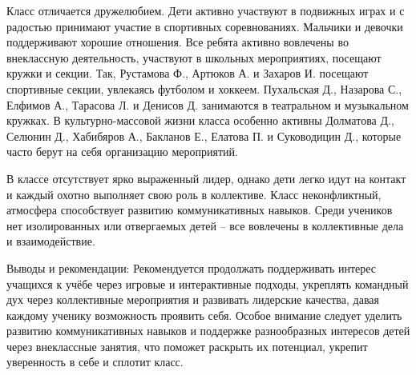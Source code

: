 \documentclass[a4paper,12pt]{article}
\begin{document}
Класс отличается дружелюбием. Дети активно участвуют в подвижных играх и с радостью принимают участие в спортивных соревнованиях. Мальчики и девочки поддерживают хорошие отношения. Все ребята активно вовлечены во внеклассную деятельность, участвуют в школьных мероприятиях, посещают кружки и секции. Так, Рустамова Ф., Артюков А. и Захаров И. посещают спортивные секции, увлекаясь футболом и хоккеем. Пухальская Д., Назарова С., Елфимов А., Тарасова Л. и Денисов Д. занимаются в театральном и музыкальном кружках. В культурно-массовой жизни класса особенно активны Долматова Д., Селюнин Д., Хабибяров А., Бакланов Е., Елатова П. и Суководицин Д., которые часто берут на себя организацию мероприятий.

В классе отсутствует ярко выраженный лидер, однако дети легко идут на контакт и каждый охотно выполняет свою роль в коллективе. Класс неконфликтный, атмосфера способствует развитию коммуникативных навыков. Среди учеников нет изолированных или отвергаемых детей – все вовлечены в коллективные дела и взаимодействие.

Выводы и рекомендации:  
Рекомендуется продолжать поддерживать интерес учащихся к учёбе через игровые и интерактивные подходы, укреплять командный дух через коллективные мероприятия и развивать лидерские качества, давая каждому ученику возможность проявить себя. Особое внимание следует уделить развитию коммуникативных навыков и поддержке разнообразных интересов детей через внеклассные занятия, что поможет раскрыть их потенциал, укрепит уверенность в себе и сплотит класс.
\end{document}
